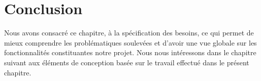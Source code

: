 \section*{Conclusion}
\qquad Nous avons consacré ce chapitre, à la spécification des besoins, ce qui permet de mieux comprendre les problématiques soulevées et d’avoir une vue globale sur les fonctionnalités constituantes notre projet. Nous nous intéressons dans le chapitre suivant aux éléments de conception basée sur le travail effectué dans le présent chapitre.